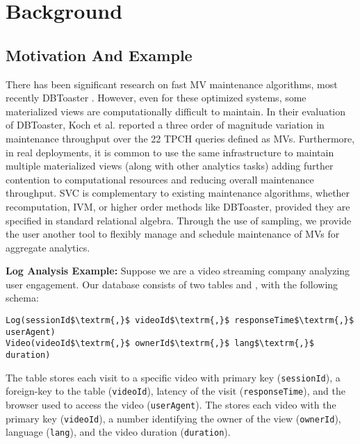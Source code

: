 \section{Background}\label{sec-background}

\subsection{Motivation And Example}\label{subsec-inc}
There has been significant research on fast MV maintenance algorithms, most recently DBToaster \cite{DBLP:journals/vldb/KochAKNNLS14}.
However, even for these optimized systems, some materialized views are computationally difficult to maintain.
In their evaluation of DBToaster, Koch et al. \cite{DBLP:journals/vldb/KochAKNNLS14} reported a three order of magnitude variation in maintenance
throughput over the 22 TPCH queries defined as MVs.
Furthermore, in real deployments, it is common to use the same infrastructure to maintain multiple materialized views (along with other analytics tasks) adding further contention to computational resources and reducing overall maintenance throughput.
SVC is complementary to existing maintenance algorithms, whether recomputation, IVM, or higher order methods like DBToaster, provided they are specified in standard relational algebra.
Through the use of sampling, we provide the user another tool to flexibly manage and schedule maintenance of MVs for aggregate analytics.

\vspace{0.5em}

\noindent \textbf{Log Analysis Example: } %
Suppose we are a video streaming company analyzing user engagement.
Our database consists of two tables  and , with the following schema:
\begin{lstlisting}[mathescape,basicstyle={\scriptsize}]
Log(sessionId$\textrm{,}$ videoId$\textrm{,}$ responseTime$\textrm{,}$ userAgent)
Video(videoId$\textrm{,}$ ownerId$\textrm{,}$ lang$\textrm{,}$ duration)
\end{lstlisting}
The  table stores each visit to a specific video with primary key (\texttt{sessionId}), a foreign-key to the  table (\texttt{videoId}), latency of the visit (\texttt{responseTime}), and the browser used to access the video (\texttt{userAgent}).
The  stores each video with the primary key (\texttt{videoId}), a number identifying the owner of the view (\texttt{ownerId}), language (\texttt{lang}), and the video duration (\texttt{duration}).

